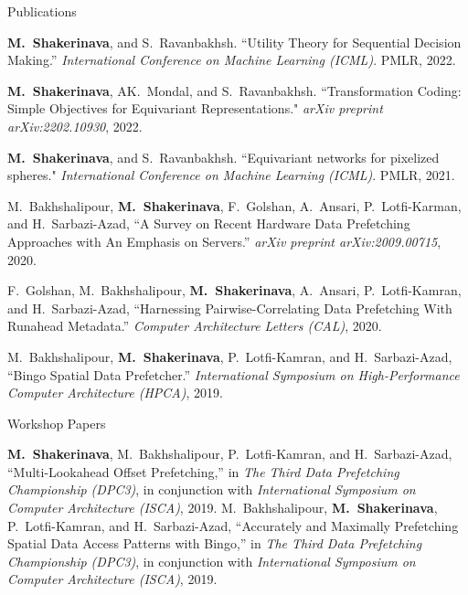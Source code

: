 \documentclass{resume}
\newcommand{\InternalSpace}{\vspace{0.18cm}}
\newenvironment{MySection}[1]
{\begin{category}{#1}}
{\end{category}}
\newcommand{\MyItem}{\citembullet}
\begin{document}
\begin{MySection}{Publications}



\MyItem \textbf{M.~Shakerinava}, and S.~Ravanbakhsh. {``Utility Theory for Sequential Decision Making.''} \textit{International Conference on Machine Learning (ICML)}. PMLR, 2022.

\MyItem \textbf{M.~Shakerinava}, AK.~Mondal, and S.~Ravanbakhsh. {``Transformation Coding: Simple Objectives for Equivariant Representations."} \textit{arXiv preprint arXiv:2202.10930}, 2022.

\MyItem \textbf{M.~Shakerinava}, and S.~Ravanbakhsh. {``Equivariant networks for pixelized spheres."} \textit{International Conference on Machine Learning (ICML)}. PMLR, 2021.

\MyItem M.~Bakhshalipour, \textbf{M.~Shakerinava}, F.~Golshan, A.~Ansari, P.~Lotfi-Karman, and H.~Sarbazi-Azad, {``A Survey on Recent Hardware Data Prefetching Approaches with An Emphasis on Servers.''} \textit{arXiv preprint arXiv:2009.00715}, 2020.

\MyItem F.~Golshan, M.~Bakhshalipour, \textbf{M.~Shakerinava}, A.~Ansari, P.~Lotfi-Kamran, and H.~Sarbazi-Azad, {``Harnessing Pairwise-Correlating Data Prefetching With Runahead Metadata.''} \textit{Computer Architecture Letters (CAL)}, 2020.

\MyItem M.~Bakhshalipour, \textbf{M.~Shakerinava}, P.~Lotfi-Kamran, and H.~Sarbazi-Azad, {``Bingo Spatial Data Prefetcher.''} \textit{International Symposium on High-Performance Computer Architecture (HPCA)}, 2019.

\end{MySection}

\InternalSpace

\begin{MySection}{Workshop Papers}

\MyItem \textbf{M.~Shakerinava}, M.~Bakhshalipour, P.~Lotfi-Kamran, and H.~Sarbazi-Azad, {``Multi-Lookahead Offset Prefetching,''} in \textit{The Third Data Prefetching Championship (DPC3)}, in conjunction with \textit{International Symposium on Computer Architecture (ISCA)}, 2019.
\MyItem M.~Bakhshalipour, \textbf{M.~Shakerinava}, P.~Lotfi-Kamran, and H.~Sarbazi-Azad, {``Accurately and Maximally Prefetching Spatial Data Access Patterns with Bingo,''} in \textit{The Third Data Prefetching Championship (DPC3)}, in conjunction with \textit{International Symposium on Computer Architecture (ISCA)}, 2019.

\end{MySection}
\end{document}

